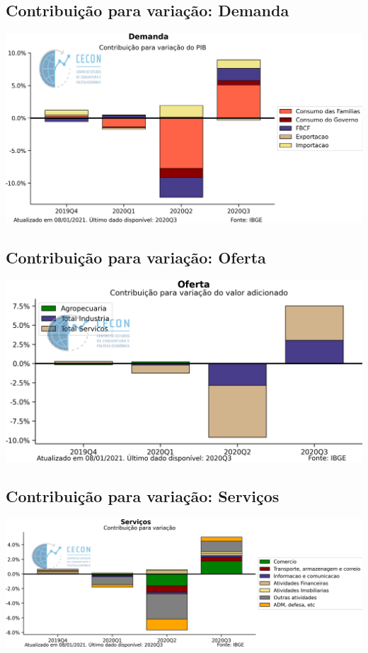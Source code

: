 \documentclass{SelfArx}
\begin{document}
\subsection*{Contribuição para variação: Demanda}
\label{sec:org25ac236}

\begin{center}
\includegraphics[width=.9\linewidth]{./figs/PIB/Contrib_Demanda.png}
\end{center}

\subsection*{Contribuição para variação: Oferta}
\label{sec:org70b6165}

\begin{center}
\includegraphics[width=.9\linewidth]{./figs/PIB/Contrib_Oferta.png}
\end{center}


\subsection*{Contribuição para variação: Serviços}
\label{sec:org1adbcaf}

\begin{center}
\includegraphics[width=.9\linewidth]{./figs/PIB/Contrib_Servicos.png}
\end{center}
\end{document}
